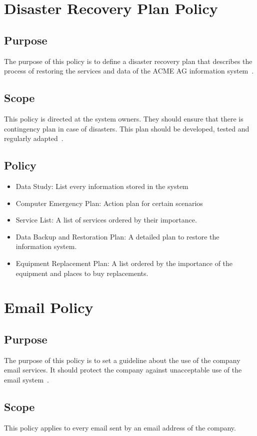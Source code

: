 \chapter{Disaster Recovery Plan Policy}
\section{Purpose}
The purpose of this policy is to define a disaster recovery plan that describes the process of restoring the services and data of the ACME AG information system~\cite{Sans}.
\section{Scope}
This policy is directed at the system owners. They should ensure that there is contingency plan in case of disasters. This plan should be developed, tested and regularly adapted~\cite{Sans}.
\section{Policy}
\begin{itemize}
\item Data Study: List every information stored in the system
\item Computer Emergency Plan: Action plan for certain scenarios
\item Service List: A list of services ordered by their importance.
\item Data Backup and Restoration Plan: A detailed plan to restore the information system.
\item Equipment Replacement Plan: A list ordered by the importance of the equipment and places to buy replacements. 
\end{itemize}
\chapter{Email Policy}
\section{Purpose}
The purpose of this policy is to set a guideline about the use of the company email services. It should protect the company against unacceptable use of the email system~\cite{Sans}.
\section{Scope}
This policy applies to every email sent by an email address of the company. 
